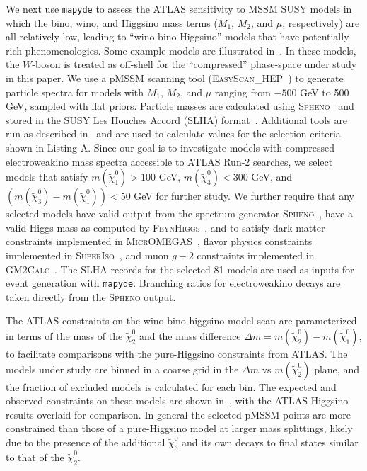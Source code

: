 \documentclass{article}
\newcommand{\chioz}{\ensuremath{\widetilde{\chi}_{1}^{0}}}
\newcommand{\chitz}{\ensuremath{\widetilde{\chi}_{2}^{0}}}
\newcommand{\chithz}{\ensuremath{\widetilde{\chi}_{3}^{0}}}
\newcommand{\mapyde}{\texttt{mapyde}}
\newcommand{\easyscanhep}{\textsc{EasyScan\_HEP}}
\newcommand{\spheno}{\textsc{Spheno}}
\newcommand{\feynhiggs}{\textsc{FeynHiggs}}
\newcommand{\micromegas}{\textsc{MicrOMEGAS}}
\newcommand{\superiso}{\textsc{SuperIso}}
\newcommand{\gmtwocalc}{\textsc{GM2Calc}}
\begin{document}
We next use \mapyde{} to assess the ATLAS sensitivity to MSSM SUSY models in which the bino, wino, and Higgsino mass terms ($M_1$, $M_2$, and $\mu$, respectively) are all relatively low, leading to \enquote{wino-bino-Higgsino} models that have potentially rich phenomenologies. Some example models are illustrated in~.  In these models, the $W$-boson is treated as off-shell for the \enquote{compressed} phase-space under study in this paper.  We use a pMSSM scanning tool (\easyscanhep~\cite{Shang:2023gfy,Han:2016gvr}) to generate particle spectra for models with $M_1$, $M_2$, and $\mu$ ranging from $-500$ GeV to 500 GeV, sampled with flat priors.
Particle masses are calculated using \spheno~\cite{Porod:2003um,Porod:2011nf} and stored in the SUSY Les Houches Accord (SLHA) format~\cite{Allanach:2008qq}.  Additional tools are run as described in~ and are used to calculate values for the selection criteria shown in Listing A.  Since our goal is to investigate models with compressed electroweakino mass spectra accessible to ATLAS Run-2 searches, we select models that satisfy $m(\chioz) > 100$ GeV, $m(\chithz)<300$ GeV, and $(m(\chithz)-m(\chioz))<50$ GeV for further study.  We further require that any selected models have valid output from the spectrum generator \spheno~\cite{Porod:2003um,Porod:2011nf}, have a valid Higgs mass as computed by \feynhiggs~\cite{Bahl:2018qog,Bahl:2017aev,Bahl:2016brp,Hahn:2013ria,Frank:2006yh,Degrassi:2002fi,Heinemeyer:1998np,Heinemeyer:1998yj}, and to satisfy dark matter constraints implemented in \micromegas~\cite{Belanger:2020gnr}, flavor physics constraints implemented in \superiso~\cite{Arbey:2018msw}, and muon $g-2$ constraints implemented in \gmtwocalc~\cite{Athron:2015rva,Athron:2021evk}.  The SLHA records for the selected 81 models are used as inputs for event generation with \mapyde.  Branching ratios for electroweakino decays are taken directly from the \spheno{} output.

The ATLAS constraints on the wino-bino-higgsino model scan are parameterized in terms of the mass of the \chitz{} and the mass difference $\Delta m=m(\chitz)-m(\chioz)$, to facilitate comparisons with the pure-Higgsino constraints from ATLAS.  The models under study are binned in a coarse grid in the $\Delta m$ vs $m(\chitz)$ plane, and the fraction of excluded models is calculated for each bin.  The expected and observed constraints on these models are shown in~, with the ATLAS Higgsino results overlaid for comparison.  In general the selected pMSSM points are more constrained than those of a pure-Higgsino model at larger mass splittings, likely due to the presence of the additional \chithz{} and its own decays to final states similar to that of the \chitz.
\end{document}
